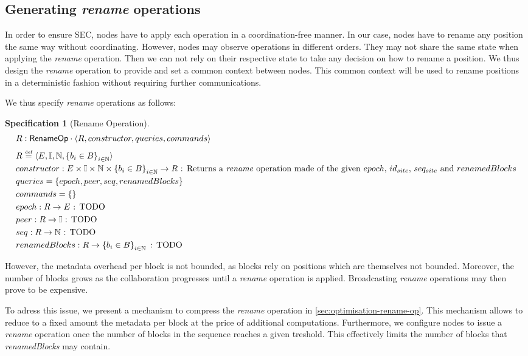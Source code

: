 \documentclass{article}
\newcommand{\commands}[1]{commands = \set{#1}}
\newcommand{\defeq}{\overset{\underset{\mathrm{def}}{}}{=}}
\newcommand{\fnspec}[3]{#1: #2 \text{ : #3}}
\newcommand{\inbb}[1]{\in \mathbb{#1}}
\newcommand{\mathlist}[2]{\set{#1_i \in #2}_{i \inbb{N}}}
\newcommand{\queries}[1]{queries = \set{#1}}
\newcommand{\set}[1]{\left\{#1\right\}} %
\newcommand{\spectuple}[1]{\tuple{#1, constructor, queries, commands}}
\newcommand{\tuple}[1]{\langle #1 \rangle}
\theoremstyle{definition}
\newtheorem{specification}{Specification}
\begin{document}
\subsection{Generating \emph{rename} operations}

In order to ensure \ac{SEC}, nodes have to apply each operation in a coordination-free manner.
In our case, nodes have to rename any position the same way without coordinating.
However, nodes may observe operations in different orders.
They may not share the same state when applying the \emph{rename} operation.
Then we can not rely on their respective state to take any decision on how to rename a position.
We thus design the \emph{rename} operation to provide and set a common context between nodes.
This common context will be used to rename positions in a deterministic fashion without requiring further communications.

We thus specify \emph{rename} operations as follows:

\begin{specification}[Rename Operation]
    \begin{align*}
    &R: \mathsf{RenameOp} \cdot \spectuple{R}\\
    &R \defeq \tuple{E, \mathbb{I}, \mathbb{N}, \mathlist{b}{B}}\\
    &\fnspec{constructor}{E \times \mathbb{I} \times \mathbb{N} \times \mathlist{b}{B} \to R}{Returns a \emph{rename} operation made of the given $epoch$, $id_{site}$, $seq_{site}$ and $renamedBlocks$}\\
    &\queries{epoch, peer, seq, renamedBlocks}\\
    &\commands{}\\
    &\fnspec{epoch}{R \to E}{TODO}\\
    &\fnspec{peer}{R \to \mathbb{I}}{TODO}\\
    &\fnspec{seq}{R \to \mathbb{N}}{TODO}\\
    &\fnspec{renamedBlocks}{R \to \mathlist{b}{B}}{TODO}
    \end{align*}
    \label{spec:rename}
\end{specification}

However, the metadata overhead per block is not bounded, as blocks rely on positions which are themselves not bounded.
Moreover, the number of blocks grows as the collaboration progresses until a \emph{rename} operation is applied.
Broadcasting \emph{rename} operations may then prove to be expensive.

To adress this issue, we present a mechanism to compress the \emph{rename} operation in \autoref{sec:optimisation-rename-op}.
This mechanism allows to reduce to a fixed amount the metadata per block at the price of additional computations.
Furthermore, we configure nodes to issue a \emph{rename} operation once the number of blocks in the sequence reaches a given treshold.
This effectively limits the number of blocks that \emph{renamedBlocks} may contain.
\end{document}
